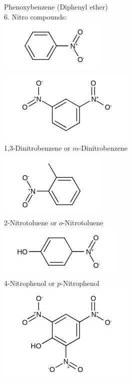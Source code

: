 \documentclass[10pt]{article}
\begin{document}
Phenoxybenzene (Diphenyl ether)\\
6. Nitro compounds:\\
\includegraphics{smile-8cc375bec2d51c30c3613fb97c18a7eb804da591}\\
\includegraphics{smile-fcaf777244384c242d6aed94051ee68e2c6bf54b}\\
1,3-Dinitrobenzene or $m$-Dinitrobenzene\\
\includegraphics{smile-ad2434382295846e4a6105d5cc0f9bd73f53a72c}\\
2-Nitrotoluene or $o$-Nitrotoluene\\
\includegraphics{smile-72babd064d2ceab64cb370c25a861b0f19308aab}\\
4-Nitrophenol or $p$-Nitrophenol\\
\includegraphics{smile-52a5ee626c710930e5cbf0239adaf3a24af513a2}
\end{document}
